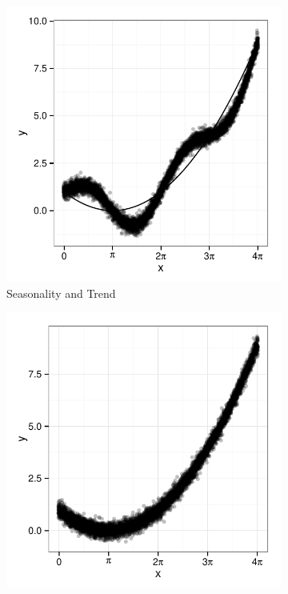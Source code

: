 \documentclass[11pt]{isuthesis}\usepackage[]{graphicx}\usepackage[]{color}
\newenvironment{knitrout}{}{} %
\begin{document}
\begin{figure}[h!tbp]
\begin{subfigure}[b]{.31\linewidth}
\begin{knitrout}
{\centering \includegraphics[width=\linewidth]{Figure/sineIllusion/fig-simulation1Sine2-1} 

}



\end{knitrout}
  \caption{\small Seasonality and Trend}
  \label{simulation2}
\end{subfigure}
\begin{subfigure}[b]{.31\linewidth}\centering
\begin{knitrout}
\color{fgcolor}

{\centering \includegraphics[width=\linewidth]{Figure/sineIllusion/fig-simulation1Sine3-1} 

}
\end{knitrout}
\end{subfigure}
\end{figure}
\end{document}
